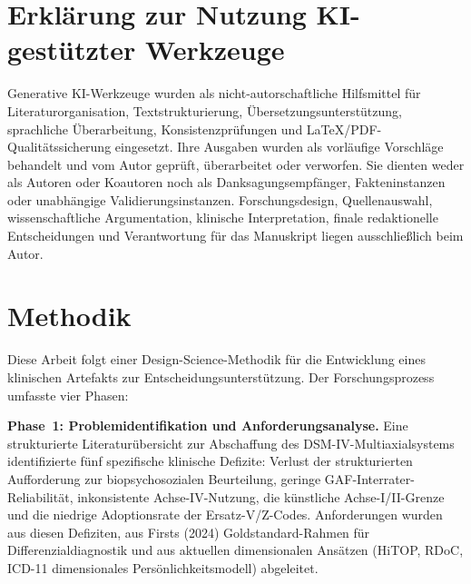 \documentclass[11pt,a4paper]{article}
\begin{document}
\newpage
\begingroup
\footnotesize
{}
\setlength{\parskip}{0pt}
\tableofcontents
\endgroup

\section*{Erkl\"arung zur Nutzung KI-gest\"utzter Werkzeuge}

Generative KI-Werkzeuge wurden als nicht-autorschaftliche Hilfsmittel f\"ur Literaturorganisation, Textstrukturierung, \"Ubersetzungsunterst\"utzung, sprachliche \"Uberarbeitung, Konsistenzpr\"ufungen und LaTeX/PDF-Qualit\"atssicherung eingesetzt. Ihre Ausgaben wurden als vorl\"aufige Vorschl\"age behandelt und vom Autor gepr\"uft, \"uberarbeitet oder verworfen. Sie dienten weder als Autoren oder Koautoren noch als Danksagungsempf\"anger, Fakteninstanzen oder unabh\"angige Validierungsinstanzen. Forschungsdesign, Quellenauswahl, wissenschaftliche Argumentation, klinische Interpretation, finale redaktionelle Entscheidungen und Verantwortung f\"ur das Manuskript liegen ausschlie\ss{}lich beim Autor.

\newpage

\section{Methodik}

Diese Arbeit folgt einer Design-Science-Methodik f\"ur die Entwicklung eines klinischen Artefakts zur Entscheidungsunterst\"utzung. Der Forschungsprozess umfasste vier Phasen:

\textbf{Phase~1: Problemidentifikation und Anforderungsanalyse.} Eine strukturierte Literatur\"ubersicht zur Abschaffung des DSM-IV-Multiaxialsystems identifizierte f\"unf spezifische klinische Defizite: Verlust der strukturierten Aufforderung zur biopsychosozialen Beurteilung, geringe GAF-Interrater-Reliabilit\"at, inkonsistente Achse-IV-Nutzung, die k\"unstliche Achse-I/II-Grenze und die niedrige Adoptionsrate der Ersatz-V/Z-Codes. Anforderungen wurden aus diesen Defiziten, aus Firsts (2024) Goldstandard-Rahmen f\"ur Differenzialdiagnostik und aus aktuellen dimensionalen Ans\"atzen (HiTOP, RDoC, ICD-11 dimensionales Pers\"onlichkeitsmodell) abgeleitet.
\end{document}
